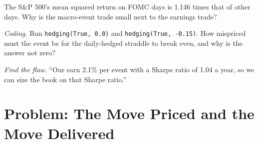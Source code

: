 \begin{exercise}[$\star\star$]\label{exo:s2:gamma-scalping-and-event-volatility:6}
The S\&P 500's mean squared return on FOMC days is 1.146 times that of other days. Why is the macro-event trade small next to the earnings trade?
\end{exercise}

\begin{exercise}[$\star\star\star$]\label{exo:s2:gamma-scalping-and-event-volatility:7}
\emph{Coding.} Run \texttt{hedging(True, 0.0)} and \texttt{hedging(True, -0.15)}. How mispriced must the event be for the daily-hedged straddle to
break even, and why is the answer not zero?
\end{exercise}

\begin{exercise}[$\star\star\star$]\label{exo:s2:gamma-scalping-and-event-volatility:8}
\emph{Find the flaw.} ``Our  earn 2.1\% per event with a Sharpe ratio of 1.04 a year, so we can size the book on that Sharpe ratio.''
\end{exercise}

\section{Problem: The Move Priced and the Move Delivered}

